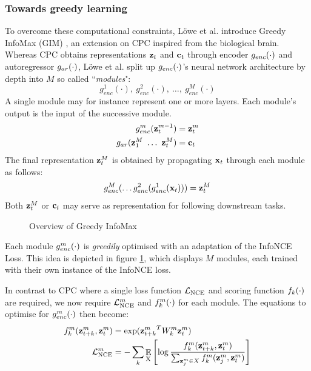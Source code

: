 \subsubsection{Towards greedy learning}	
		To overcome these computational constraints, Löwe et al. introduce Greedy InfoMax (GIM) \citep{lowePuttingEndEndtoEnd2020}, an extension on CPC inspired from the biological brain. Whereas CPC obtains representations $\mathbf{z}_t$ and $\mathbf{c}_t$ through encoder $g_{enc}(\cdot)$ and autoregressor $g_{ar}(\cdot)$, Löwe et al. split up $g_{enc}(\cdot)$'s neural network architecture by depth into $M$ so called ``\textit{modules}": 
		$$g_{enc}^1(\cdot),~ g_{enc}^2(\cdot),~\dots,~g_{enc}^M(\cdot)$$ 
		A single module may for instance represent one or more layers. Each module's output is the input of the successive module.
		\begin{align*} %
			g_{enc}^m(\zt^{m-1}) &= \zt^m \\
			g_{ar}(\z_1^M ~ \dots ~ \zt^M) &= \ct
		\end{align*}
		The final representation $\mathbf{z}_t^M$ is obtained by propagating $\mathbf{x}_t$ through each module as follows:
		$$ g_{enc}^M ( \dots	g_{enc}^2(g_{enc}^1(\mathbf{x}_t))) = \mathbf{z}_t^M $$
		Both $\mathbf{z}_t^M$ or $\mathbf{c}_t$ may serve as representation for following downstream tasks.
	
	\begin{figure}[h!t]
		\hspace{2cm}
		
		\caption{Overview of Greedy InfoMax}
		\label{fig:gim-overview}
	\end{figure}


	
		Each module $g_{enc}^m(\cdot)$ is \textit{greedily} optimised with an adaptation of the InfoNCE Loss. This idea is depicted in figure \ref{fig:gim-overview}, which displays $M$ modules, each trained with their own instance of the InfoNCE loss.
		
		In contrast to CPC where a single loss function $\mathcal{L}_{\text{NCE}}$ and scoring function $f_k(\cdot)$ are required, we now require $\mathcal{L}_{\text{NCE}}^m$ and $f_k^m(\cdot)$ for each module. The equations to optimise for $g_{enc}^m(\cdot)$ then become:
		\begin{align}
			f_k^m(\mathbf{z}_{t+k}^m,\mathbf{z}_t^m) &= \exp({\mathbf{z}_{t+k}^m}^TW_k^m\mathbf{z}_t^m) \label{eq:fkm} \\
			\mathcal{L}_{\text{NCE}}^m &= -\sum_{k} \mathop{\mathbb{E}}_{\substack{\textsubscript{X}}} \left[\log \frac{f_k^m({\mathbf{z}_{t+k}^m},{\mathbf{z}_t^m}) }{\sum_{\mathbf{z}_j^m \in X} f_k^m(\mathbf{z}_j^m, \mathbf{z}_t^m)} \right]	
		\end{align}
	
